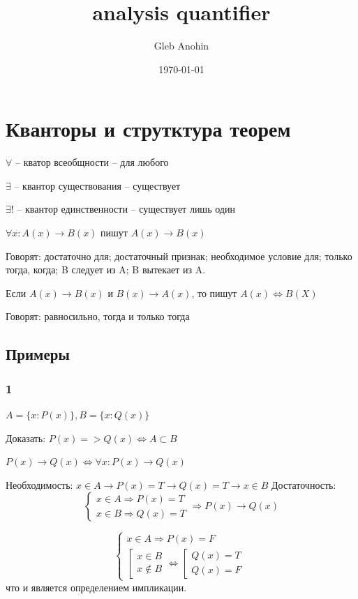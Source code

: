 \documentclass[letterpaper]{article}
\author{Gleb Anohin}
\date{\today}
\title{analysis quantifier}
\begin{document}
\maketitle
\tableofcontents

\section{Кванторы и струтктура теорем}
\label{sec:org875b29e}
\(\forall\) -- кватор всеобщности -- для любого

\(\exists\) -- квантор существования -- существует

\(\exists!\) -- квантор единственности -- существует лишь один

\(\forall x: A(x) \rightarrow B(x)\) пишут \(A(x) \rightarrow B(x)\)

Говорят: достаточно для; достаточный признак; необходимое условие для; только тогда, когда; B следует из A; B вытекает из A.

Если \(A(x) \rightarrow B(x)\) и \(B(x) \rightarrow A(x)\), то пишут \(A(x) \iff B(X)\)

Говорят: равносильно, тогда и только тогда
\subsection{Примеры}
\label{sec:org4e0c7de}
\subsubsection{1}
\label{sec:org7072284}
\(A = \{x: P(x)\}, B = \{x: Q(x)\}\)

Доказать: \(P(x) => Q(x) \iff A \subset B\)

\(P(x) \rightarrow Q(x) \iff \forall x: P(x) \rightarrow Q(x)\)

Необходимость: \(x \in A \rightarrow P(x) = T \rightarrow Q(x) = T \rightarrow x \in B\)
Достаточность:
\begin{equation}
\begin{cases}
x \in A \Rightarrow P(x) = T\\
x \in B \Rightarrow Q(x) = T
\end{cases}
\Rightarrow P(x) \rightarrow Q(x)
\end{equation}

\begin{equation}
\begin{cases}
x \in A \Rightarrow P(x) = F \\
\left[
\begin{array}{ll}
x \in B \\
x \notin B
\end{array}
\right.
\iff
\left[
\begin{array}{ll}
Q(x) = T \\
Q(x) = F
\end{array}
\right.
\end{cases}
\end{equation}
что и является определением импликации.
\end{document}
